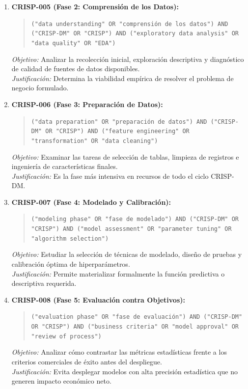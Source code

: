 \begin{enumerate}
  \textit{Justificación:} La principal causa de fracaso en proyectos de analítica es la desalineación con el negocio.
  \item \textbf{CRISP-005 (Fase 2: Comprensión de los Datos):}
  \begin{quote}
  \texttt{("data understanding" OR "comprensión de los datos") AND ("CRISP-DM" OR "CRISP") AND ("exploratory data analysis" OR "data quality" OR "EDA")}
  \end{quote}
  \textit{Objetivo:} Analizar la recolección inicial, exploración descriptiva y diagnóstico de calidad de fuentes de datos disponibles.\\
  \textit{Justificación:} Determina la viabilidad empírica de resolver el problema de negocio formulado.
  \item \textbf{CRISP-006 (Fase 3: Preparación de Datos):}
  \begin{quote}
  \texttt{("data preparation" OR "preparación de datos") AND ("CRISP-DM" OR "CRISP") AND ("feature engineering" OR "transformation" OR "data cleaning")}
  \end{quote}
  \textit{Objetivo:} Examinar las tareas de selección de tablas, limpieza de registros e ingeniería de características finales.\\
  \textit{Justificación:} Es la fase más intensiva en recursos de todo el ciclo CRISP-DM.
  \item \textbf{CRISP-007 (Fase 4: Modelado y Calibración):}
  \begin{quote}
  \texttt{("modeling phase" OR "fase de modelado") AND ("CRISP-DM" OR "CRISP") AND ("model assessment" OR "parameter tuning" OR "algorithm selection")}
  \end{quote}
  \textit{Objetivo:} Estudiar la selección de técnicas de modelado, diseño de pruebas y calibración óptima de hiperparámetros.\\
  \textit{Justificación:} Permite materializar formalmente la función predictiva o descriptiva requerida.
  \item \textbf{CRISP-008 (Fase 5: Evaluación contra Objetivos):}
  \begin{quote}
  \texttt{("evaluation phase" OR "fase de evaluación") AND ("CRISP-DM" OR "CRISP") AND ("business criteria" OR "model approval" OR "review of process")}
  \end{quote}
  \textit{Objetivo:} Analizar cómo contrastar las métricas estadísticas frente a los criterios comerciales de éxito antes del despliegue.\\
  \textit{Justificación:} Evita desplegar modelos con alta precisión estadística que no generen impacto económico neto.

\end{enumerate}
